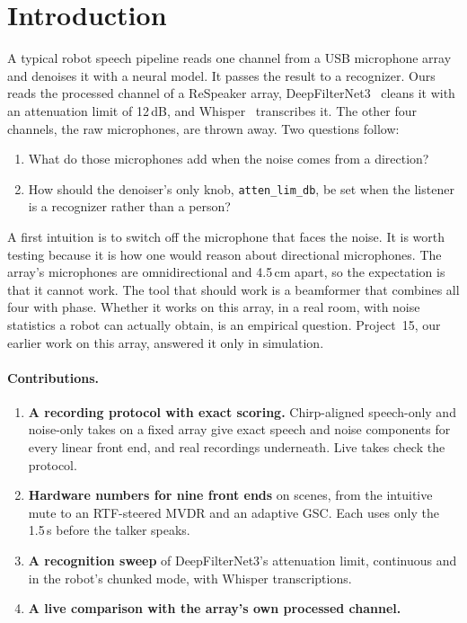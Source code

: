 \section{Introduction}
\label{sec:intro}

A typical robot speech pipeline reads one channel from a USB microphone
array and denoises it with a neural model. It passes the result to a
recognizer. Ours reads the processed channel of a ReSpeaker array,
DeepFilterNet3~\cite{schroeter2023deepfilternet3} cleans it with an
attenuation limit of 12\,dB, and Whisper~\cite{radford2023whisper}
transcribes it. The other four channels, the raw microphones, are thrown
away. Two questions follow:
\begin{enumerate}
\item What do those microphones add when the noise comes from a direction?
\item How should the denoiser's only knob, \texttt{atten\_lim\_db}, be set
  when the listener is a recognizer rather than a person?
\end{enumerate}

A first intuition is to switch off the microphone that faces the noise.
It is worth testing because it is how one would reason about directional
microphones. The array's microphones are omnidirectional and 4.5\,cm
apart, so the expectation is that it cannot work. The tool that should
work is a beamformer that combines all four with phase. Whether it works
on this array, in a real room, with noise statistics a robot can actually
obtain, is an empirical question. Project~15, our earlier work on this
array, answered it only in simulation.

\paragraph{Contributions.}
\begin{enumerate}
\item \textbf{A recording protocol with exact scoring.} Chirp-aligned
  speech-only and noise-only takes on a fixed array give exact speech and
  noise components for every linear front end, and real recordings
  underneath. Live takes check the protocol.
\item \textbf{Hardware numbers for nine front ends} on \NScenes{} scenes,
  from the intuitive mute to an RTF-steered MVDR and an adaptive GSC. Each
  uses only the 1.5\,s before the talker speaks.
\item \textbf{A recognition sweep} of DeepFilterNet3's attenuation limit,
  continuous and in the robot's chunked mode, with \NTranscripts{} Whisper
  transcriptions.
\item \textbf{A live comparison with the array's own processed channel.}
\end{enumerate}
